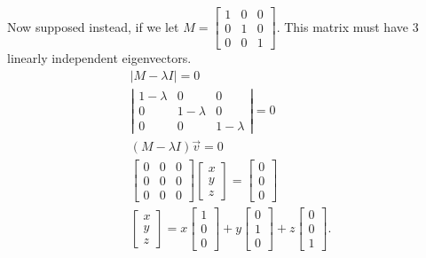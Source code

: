 Now supposed instead, if we let $M=\begin{bmatrix} 1&0&0\\0&1&0\\0&0&1 \end{bmatrix} $. This matrix must have 3 linearly independent eigenvectors.
\begin{align*}
  |M- \lambda I|=0\\
  \left| \begin{matrix} 1-\lambda &0&0\\0&1-\lambda&0\\0&0&1-\lambda \end{matrix} \right| =0\\
  (M-\lambda I)\vec{v} = 0\\
  \begin{bmatrix} 0&0&0\\0&0&0\\0&0&0 \end{bmatrix} \begin{bmatrix} x\\y\\z \end{bmatrix} =\begin{bmatrix} 0\\0\\0 \end{bmatrix} \\
  \begin{bmatrix} x\\y\\z \end{bmatrix} =x\begin{bmatrix} 1\\0\\0 \end{bmatrix} +y\begin{bmatrix} 0\\1\\0 \end{bmatrix} +z\begin{bmatrix} 0\\0\\1 \end{bmatrix} 
.\end{align*}

